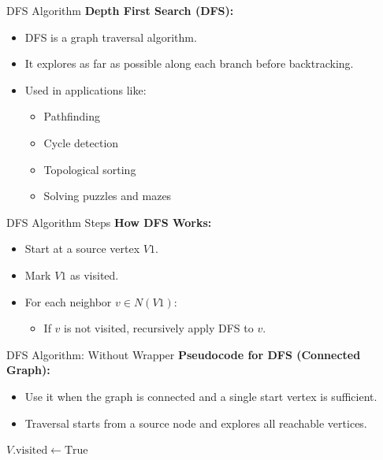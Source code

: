 \documentclass{beamer}
\begin{document}
\begin{frame}{DFS Algorithm}
    \textbf{Depth First Search (DFS):}
    \begin{itemize}
        \item DFS is a graph traversal algorithm.
        \item It explores as far as possible along each branch before backtracking.
        \item Used in applications like:
        \begin{itemize}
            \item Pathfinding
            \item Cycle detection
            \item Topological sorting
            \item Solving puzzles and mazes
        \end{itemize}
    \end{itemize}
\end{frame}

\begin{frame}{DFS Algorithm Steps}
    \textbf{How DFS Works:}
    \begin{itemize}
        \item Start at a source vertex \( V1 \).
        \item Mark \( V1 \) as visited.
        \item For each neighbor \( v \in N(V1) \):
        \begin{itemize}
            \item If \( v \) is not visited, recursively apply DFS to \( v \).
        \end{itemize}
    \end{itemize}
\end{frame}

\begin{frame}{DFS Algorithm: Without Wrapper}
    \textbf{Pseudocode for DFS (Connected Graph):}
    \begin{itemize}
        \item Use it when the graph is connected and a single start vertex is sufficient.
        \item Traversal starts from a source node and explores all reachable vertices.
    \end{itemize}

    \begin{algorithmic}[1]
            \State \( V.\text{visited} \gets \text{True} \)
                    \State {}
                \EndIf
            \EndFor
        \EndProcedure
    \end{algorithmic}
\end{frame}
\end{document}
